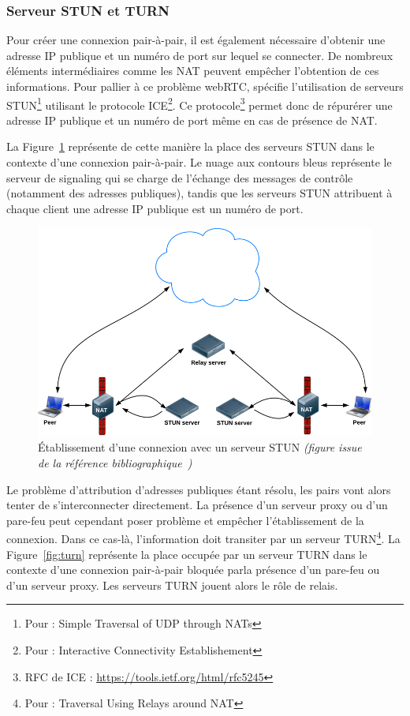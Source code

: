 \documentclass{tnreport}
\begin{document}
\subsubsection{Serveur STUN et TURN}

Pour créer une connexion pair-à-pair, il est également nécessaire d'obtenir une adresse IP publique et un numéro de port sur lequel se connecter. De nombreux éléments intermédiaires comme les NAT peuvent empêcher l'obtention de ces informations. Pour pallier à ce problème webRTC, spécifie l'utilisation de serveurs STUN\footnote{Pour : Simple Traversal of UDP through NATs} utilisant le protocole ICE\footnote{Pour : Interactive Connectivity Establishement}. Ce protocole\footnote{RFC de ICE : \url{https://tools.ietf.org/html/rfc5245}} permet donc de répurérer une adresse IP publique et un numéro de port même en cas de présence de NAT.

La Figure~\ref{fig:stun} représente de cette manière la place des serveurs STUN dans le contexte d'une connexion pair-à-pair. Le nuage aux contours bleus représente le serveur de signaling qui se charge de l'échange des messages de contrôle (notamment des adresses publiques), tandis que les serveurs STUN attribuent à chaque client une adresse IP publique est un numéro de port.

\begin{figure}[!h]
  \centering
  \includegraphics[width=14cm]{figures/stun}
  \caption{Établissement d'une connexion avec un serveur STUN \emph{(figure issue de la référence bibliographique~\cite{GettingStartedwithWebRTC})}}
  \label{fig:stun}
\end{figure}

Le problème d'attribution d'adresses publiques étant résolu, les pairs vont alors tenter de s'interconnecter directement. La présence d'un serveur proxy ou d'un pare-feu peut cependant poser problème et empêcher l'établissement de la connexion. Dans ce cas-là, l'information doit transiter par un serveur TURN\footnote{Pour : Traversal Using Relays around NAT}. La Figure~\ref{fig:turn} représente la place occupée par un serveur TURN dans le contexte d'une connexion pair-à-pair bloquée parla présence d'un pare-feu ou d'un serveur proxy. Les serveurs TURN jouent alors le rôle de relais.
\end{document}
